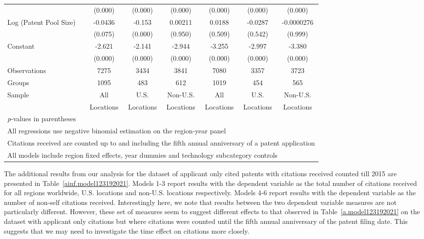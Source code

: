 \documentclass[12pt,letterpaper]{article}
\begin{document}
\begin{table}[htbp]
\begin{tabular}{l*{6}{c}}
                &  (0.000)&  (0.000)&  (0.000)&  (0.000)&  (0.000)&  (0.000)\\
Log (Patent Pool Size)&  -0.0436&   -0.153&  0.00211&   0.0188&  -0.0287&-0.0000276\\
                &  (0.075)&  (0.000)&  (0.950)&  (0.509)&  (0.542)&  (0.999)\\
Constant        &   -2.621&   -2.141&   -2.944&   -3.255&   -2.997&   -3.380\\
                &  (0.000)&  (0.000)&  (0.000)&  (0.000)&  (0.000)&  (0.000)\\
\hline
Observations    &     7275&     3434&     3841&     7080&     3357&     3723\\
Groups          &     1095&      483&      612&     1019&      454&      565\\
Sample&All &U.S. &Non-U.S.&All &U.S. &Non-U.S. \\
          &Locations &Locations&Locations&Locations &Locations&Locations \\
\hline\hline
\multicolumn{7}{l}{\footnotesize \textit{p}-values in parentheses}\\
\multicolumn{7}{l}{\footnotesize All regressions use negative binomial estimation on the region-year panel}\\
\multicolumn{7}{l}{\footnotesize Citations received are counted up to and including the fifth annual anniversary of a patent application}\\
\multicolumn{7}{l}{\footnotesize All models include region fixed effects, year dummies and technology subcategory controls}\\
\end{tabular}
\end{table}

The additional results from our analysis for the dataset of applicant only cited patents with citations received counted till 2015 are presented in Table~\ref{ainf.model123192021}. Models 1-3 report results with the dependent variable as the total number of citations received for all regions worldwide, U.S. locations and non-U.S. locations respectively. Models 4-6 report results with the dependent variable as the number of non-self citations received. Interestingly here, we note that results between the two dependent variable measures are not particularly different. However, these set of measures seem to suggest different effects to that observed in Table~\ref{a.model123192021} on the dataset with applicant only citations but where citations were counted until the fifth annual anniversary of the patent filing date. This suggests that we may need to investigate the time effect on citations more closely. \par
\end{document}

